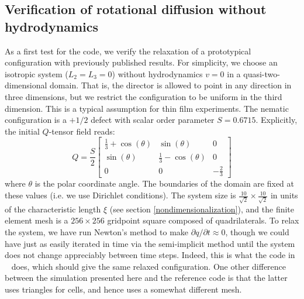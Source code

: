 \documentclass[reqno]{article}
\begin{document}
  \subsection{Verification of rotational diffusion without hydrodynamics}
  As a first test for the code, we verify the relaxation of a prototypical
  configuration with previously published results.
  For simplicity, we choose an isotropic system ($L_2 = L_3 = 0$) without
  hydrodynamics $v = 0$ in a quasi-two-dimensional domain.
  That is, the director is allowed to point in any direction in three
  dimensions, but we restrict the configuration to be uniform in the third
  dimension.
  This is a typical assumption for thin film experiments.
  The nematic configuration is a $+1/2$ defect with scalar order parameter
  $S = 0.6715$.
  Explicitly, the initial $Q$-tensor field reads:
  \begin{equation}
    Q
    =
    \frac{S}{2}
    \begin{bmatrix}
      \tfrac13 + \cos(\theta) & \sin(\theta) & 0 \\
      \sin(\theta) & \tfrac13 - \cos(\theta) & 0 \\
      0 & 0 & -\tfrac23
    \end{bmatrix}
  \end{equation}
  where $\theta$ is the polar coordinate angle.
  The boundaries of the domain are fixed at these values (i.e. we use Dirichlet
  conditions).
  The system size is $\frac{10}{\sqrt{2}} \times \frac{10}{\sqrt{2}}$ in units
  of the characteristic length $\xi$ (see section \ref{nondimensionalization}), and the finite element mesh is a $256
  \times 256$ gridpoint square composed of quadrilaterals.
  To relax the system, we have run Newton's method to make $\partial q / \partial t \approx 0$,
  though we could have just as easily iterated in time via the semi-implicit
  method until the system does not change appreciably between time steps.
  Indeed, this is what the code in ~\cite{schimming_numerical_2021} does, which should give the
  same relaxed configuration.
  One other difference between the simulation presented here and the reference
  code is that the latter uses triangles for cells, and hence uses a somewhat
  different mesh.
  
\end{document}
